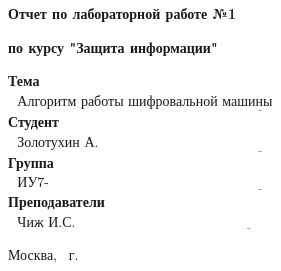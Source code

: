 \begin{center}
	\Large\textbf{Отчет по лабораторной работе №1}
	
	\Large\textbf {по курсу "Защита информации"}
\end{center}


\noindent\textbf{Тема} $\underline{\text{~~Алгоритм работы шифровальной машины ``Энигма''~~~~~~~~~~~~~~~~~~~~~~~~~~~~~~~~~~~~~~~~~~~~~~~}}$\newline\newline
\noindent\textbf{Студент} $\underline{\text{~~Золотухин А. В.~~~~~~~~~~~~~~~~~~~~~~~~~~~~~~~~~~~~~~~~~~~~~~~~~~~~~~~~~~~~~~~~~~~~~~~~~~~~~~~~~~~~~~~~~~}}$\newline\newline
\noindent\textbf{Группа} $\underline{\text{~~ИУ7-74Б~~~~~~~~~~~~~~~~~~~~~~~~~~~~~~~~~~~~~~~~~~~~~~~~~~~~~~~~~~~~~~~~~~~~~~~~~~~~~~~~~~~~~~~~~~~~~~~~~~~~~~}}$\newline\newline
\noindent\textbf{Преподаватели} $\underline{\text{~~Чиж И.С. ~~~~~~~~~~~~~~~~~~~~~~~~~~~~~~~~~~~~~~~~~~~~~~~~~~~~~~~~~~~~~~~~~~~~~~~~~~~~~~~~~~~~~~~~}}$\newline

\begin{center}
	\vfill
	Москва, \the\year
	~г.
\end{center}
\restoregeometry